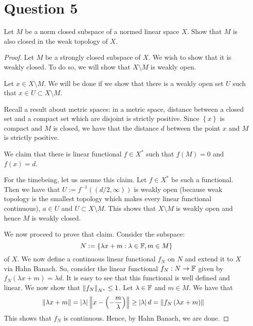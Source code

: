 \section{Question 5}
\horz
Let $M$ be a norm closed subspace of a normed linear space $X.$ Show that $M$ is also closed in the weak topology of $X.$
\horz

\begin{proof}
    Let $M$ be a strongly closed subspace of $X$. We wish to show that it is weakly closed. To do so, we will show that $X \setminus M$ is weakly open.

    Let $x \in X \setminus M$. We will be done if we show that there is a weakly open set $U$ such that $x\in U \subset X \setminus M$.

    Recall a result about metric spaces: in a metric space, distance between a closed set and a compact set which are disjoint is strictly positive. Since $\left\{ x \right\}$ is compact and $M$ is closed, we have that the distance $d$ between the point $x$ and $M$ is strictly positive.

    We claim that there is linear functional $f\in X^{*}$ such that $f\left( M \right)=0$ and $f\left( x \right)=d$.
    
    For the timebeing, let us assume this claim. Let $f\in X^{*}$ be such a functional. Then we have that $U:=f^{-1}\left( \left( d/2 , \infty \right) \right)$ is weakly open (because weak topology is the smallest topology which makes every linear functional continuous), $a \in U$ and $U  \subset X \setminus M$. This shows that $X \setminus M$ is weakly open and hence $M$ is weakly closed.

    We now proceed to prove that claim. Consider the subspace: 
    \begin{equation*}
    N:= \left\{ \lambda x + m : \lambda \in \mathbb F, m \in M \right\}
\end{equation*}
of $X$. We now define a continuous linear functional $f_{N}$ on $N$ and extend it to $X$ via Hahn Banach. So, consider the linear functional $f_{N} : N \to \mathbb F$ given by $f_{N} \left( \lambda x + m \right) = \lambda d$. It is easy to see that this functional is well defined and linear. We now show that $\left\lVert f_{N} \right\rVert_{N^{*}} \le 1$. Let $\lambda \in \mathbb F$ and $m\in M$. We have that
\begin{align*}
\left\lVert \lambda x + m \right\rVert &= \left\lvert \lambda \right\rvert \left\lVert x - \left( - \frac{m}{\lambda} \right) \right\rVert
    \ge \left\lvert \lambda \right\rvert d = \left\lVert f_{N} \left( \lambda x + m \right) \right\rVert
\end{align*}
This shows that $f_{N}$ is continuous. Hence, by Hahn Banach, we are done.
\end{proof}
